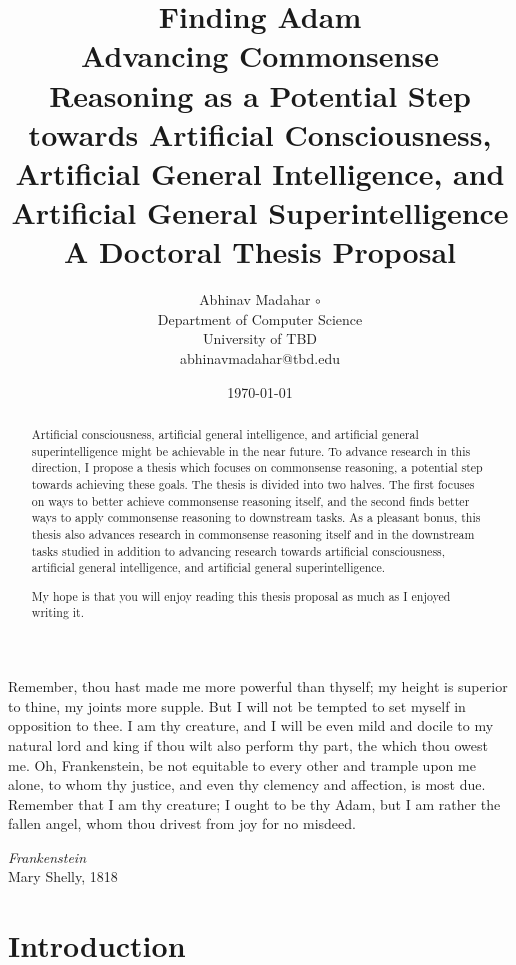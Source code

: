 \documentclass[12pt]{report}
\title{{\huge \textbf{Finding Adam}} \\ Advancing Commonsense Reasoning as a Potential Step towards Artificial Consciousness, Artificial General Intelligence, and Artificial General Superintelligence \vspace{1cm} \\ A Doctoral Thesis Proposal}
\author{Abhinav Madahar $\circ$ {\normalfont {\devanagari अभिनव मदहर}}  \\
Department of Computer Science \\
University of TBD \\
{\small abhinavmadahar@tbd.edu}}
\date{\today}
\begin{document}
\pagestyle{plain}
\maketitle

\pagebreak
\vspace*{\fill}
\noindent
Remember, thou hast made me more powerful than thyself; my height is superior to thine, my joints more supple.
But I will not be tempted to set myself in opposition to thee.
I am thy creature, and I will be even mild and docile to my natural lord and king if thou wilt also perform thy part, the which thou owest me.
Oh, Frankenstein, be not equitable to every other and trample upon me alone, to whom thy justice, and even thy clemency and affection, is
most due.
Remember that I am thy creature; I ought to be thy Adam, but I am rather the fallen angel, whom thou drivest from joy for no misdeed.

\vspace{1cm}

\noindent
\textit{Frankenstein} \\
Mary Shelly, 1818
\vspace*{\fill}

\pagebreak
\begin{abstract}
Artificial consciousness, artificial general intelligence, and artificial general superintelligence might be achievable in the near future.
To advance research in this direction, I propose a thesis which focuses on commonsense reasoning, a potential step towards achieving these goals.
The thesis is divided into two halves.
The first focuses on ways to better achieve commonsense reasoning itself, and the second finds better ways to apply commonsense reasoning to downstream tasks.
As a pleasant bonus, this thesis also advances research in commonsense reasoning itself and in the downstream tasks studied in addition to advancing research towards artificial consciousness, artificial general intelligence, and artificial general superintelligence.

My hope is that you will enjoy reading this thesis proposal as much as I enjoyed writing it.
\end{abstract}

\pagebreak
{}
\tableofcontents
\restoregeometry
\pagebreak

\cleardoublepage
{}


\chapter{Introduction}
\end{document}
